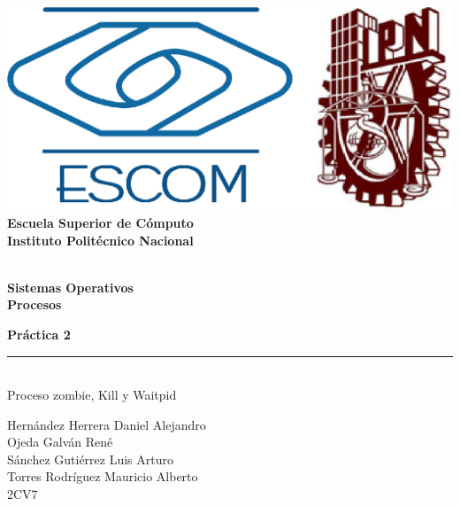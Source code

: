 
\begin{titlepage} %

    \begin{flushright}

	   \includegraphics[scale=0.15]{imagenes/escom-ipn.png}
	   \large \textbf{\\Escuela Superior de C\'omputo}
	   \large \textbf{\\Instituto Polit\'ecnico Nacional }%

	   \vspace{2.5cm} %

	   \large \textbf{\\Sistemas Operativos}%
	   \large \textbf{\\Procesos}%

	   \vspace{1.2cm} %

	   \large \textbf{Pr\'actica 2}\\%
	   \rule{6cm}{3pt} %
	   \large{\\ Proceso zombie, Kill y Waitpid} %

	   \vspace{2.5cm} %

	   Hernández Herrera Daniel Alejandro\\
	   Ojeda Galván René\\
	   Sánchez Gutiérrez Luis Arturo\\
	   Torres Rodríguez Mauricio Alberto \\ %
	   2CV7 %

	   \vspace{2.5cm} %

	   \date{\today}

    \end{flushright}

\end{titlepage}
